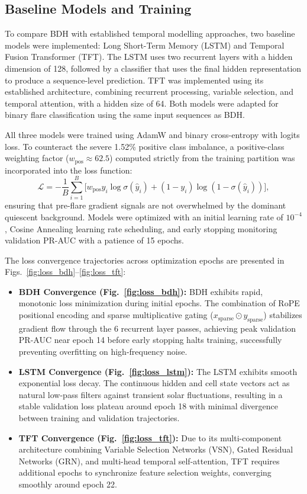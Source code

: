 \documentclass[oneside]{ieeeaccess}
\begin{document}
\subsection{Baseline Models and Training}

To compare BDH with established temporal modelling approaches, two baseline models were implemented: Long Short-Term Memory (LSTM) and Temporal Fusion Transformer (TFT). The LSTM uses two recurrent layers with a hidden dimension of 128, followed by a classifier that uses the final hidden representation to produce a sequence-level prediction. TFT was implemented using its established architecture, combining recurrent processing, variable selection, and temporal attention, with a hidden size of 64. Both models were adapted for binary flare classification using the same input sequences as BDH.

All three models were trained using AdamW and binary cross-entropy with logits loss. To counteract the severe 1.52\% positive class imbalance, a positive-class weighting factor ($w_{\mathrm{pos}} \approx 62.5$) computed strictly from the training partition was incorporated into the loss function:
\begin{equation}
\mathcal{L} = -\frac{1}{B} \sum_{i=1}^B \Big[ w_{\mathrm{pos}} y_i \log \sigma(\hat{y}_i) + (1 - y_i) \log (1 - \sigma(\hat{y}_i)) \Big],
\end{equation}
ensuring that pre-flare gradient signals are not overwhelmed by the dominant quiescent background. Models were optimized with an initial learning rate of $10^{-4}$, Cosine Annealing learning rate scheduling, and early stopping monitoring validation PR-AUC with a patience of 15 epochs.

The loss convergence trajectories across optimization epochs are presented in Figs.~\ref{fig:loss_bdh}--\ref{fig:loss_tft}:
\begin{itemize}
    \item \textbf{BDH Convergence (Fig.~\ref{fig:loss_bdh}):} BDH exhibits rapid, monotonic loss minimization during initial epochs. The combination of RoPE positional encoding and sparse multiplicative gating ($x_{\mathrm{sparse}} \odot y_{\mathrm{sparse}}$) stabilizes gradient flow through the 6 recurrent layer passes, achieving peak validation PR-AUC near epoch 14 before early stopping halts training, successfully preventing overfitting on high-frequency noise.
    \item \textbf{LSTM Convergence (Fig.~\ref{fig:loss_lstm}):} The LSTM exhibits smooth exponential loss decay. The continuous hidden and cell state vectors act as natural low-pass filters against transient solar fluctuations, resulting in a stable validation loss plateau around epoch 18 with minimal divergence between training and validation trajectories.
    \item \textbf{TFT Convergence (Fig.~\ref{fig:loss_tft}):} Due to its multi-component architecture combining Variable Selection Networks (VSN), Gated Residual Networks (GRN), and multi-head temporal self-attention, TFT requires additional epochs to synchronize feature selection weights, converging smoothly around epoch 22.
\end{itemize}
\end{document}
